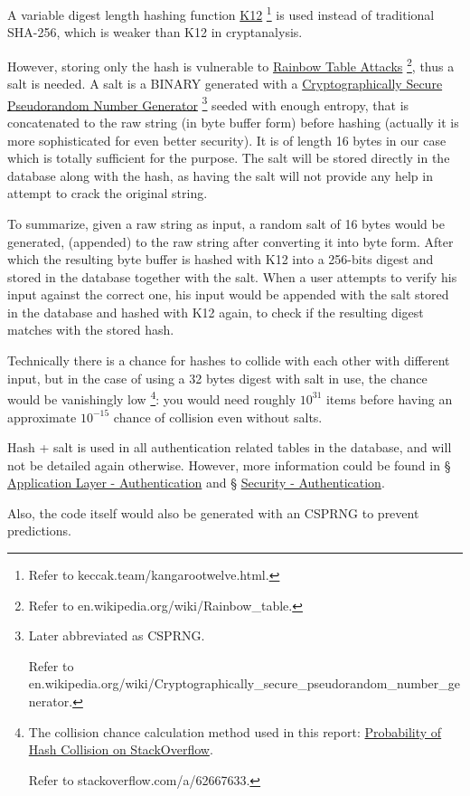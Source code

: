 \documentclass[12pt]{report}
\newcommand{\n}{\par}
\begin{document}
\begin{itemize}
	      A variable digest length hashing function
	      \href{https://keccak.team/kangarootwelve.html}{K12}
	      \footnote{Refer to keccak.team/kangarootwelve.html.}
	      is used instead of traditional SHA-256, which is weaker than K12 in cryptanalysis.\n
	      However, storing only the hash is vulnerable to
	      \href{https://en.wikipedia.org/wiki/Rainbow_table}{Rainbow Table Attacks}
	      \footnote{Refer to en.wikipedia.org\-/wiki/Rainbow\_table.},
	      thus a salt is needed. A salt is a BINARY generated with a
	      \href{https://en.wikipedia.org/wiki/Cryptographically_secure_pseudorandom_number_generator}{Cryptographically Secure Pseudorandom Number Generator}
	      \footnote{Later abbreviated as CSPRNG.\n
		      Refer to en.wikipedia.org/wiki/Cryptographically\_secure\_pseudorandom\_number\_generator.}
	      seeded with enough entropy, that is concatenated to the raw string (in byte buffer form) before hashing
	      (actually it is more sophisticated for even better security).
	      It is of length 16 bytes in our case which is totally sufficient for the purpose.
	      The salt will be stored directly in the database along with the hash,
	      as having the salt will not provide any help in attempt to crack the original string.\n
	      To summarize, given a raw string as input, a random salt of 16 bytes would be generated,
	      (appended) to the raw string after converting it into byte form.
	      After which the resulting byte buffer is hashed with K12 into a 256-bits digest and stored in the database together with the salt.
	      When a user attempts to verify his input against the correct one,
	      his input would be appended with the salt stored in the database and hashed with K12 again,
	      to check if the resulting digest matches with the stored hash.\n
	      Technically there is a chance for hashes to collide with each other with different input,
	      but in the case of using a 32 bytes digest with salt in use, the chance would be vanishingly low
	      \footnote{The collision chance calculation method used in this report: \href{https://stackoverflow.com/a/62667633}{Probability of Hash Collision on StackOverflow}.\n
		      Refer to stackoverflow.com/a/62667633.}:
	      you would need roughly $10^{31}$ items before having an approximate $10^{-15}$ chance of collision even without salts.\n
	      Hash + salt is used in all authentication related tables in the database, and will not be detailed again otherwise.
	      However, more information could be found in
	      \S{} \hyperref[application-layer.implementation.authentication]{Application Layer - Authentication} and
	      \S{} \hyperref[security.authentication]{Security - Authentication}.
\end{itemize}
Also, the code itself would also be generated with an CSPRNG to prevent predictions.
\end{document}

